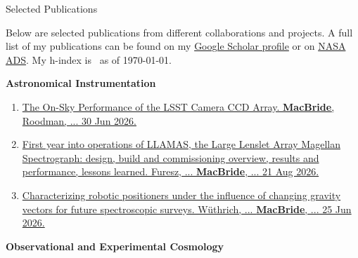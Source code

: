 \begin{rSection}{Selected Publications}

Below are selected publications from different collaborations and projects. A full list of my publications can be found on my \href{https://scholar.google.com/citations?user=XtRTswUAAAAJ&hl=en}{Google Scholar profile} or on \href{https://ui.adsabs.harvard.edu/search/fq=\%7B!type\%3Daqp\%20v\%3D\%24fq_database\%7D&fq_database=(database\%3Aastronomy\%20OR\%20database\%3Aphysics)&p_=0&q=((\%20author\%3A\%22Macbride\%2C\%20Sean\%22)\%20AND\%20year\%3A2019-2150)&sort=date\%20desc\%2C\%20bibcode\%20desc}{NASA ADS}. My h-index is \hindex\ as of \today.

\begin{rSubsection}{\textbf{Astronomical Instrumentation}}{}{}{}
\begin{enumerate}
    \item \href{https://arxiv.org/abs/2606.31806}{The On-Sky Performance of the LSST Camera CCD Array. \textbf{MacBride}, Roodman, ... 30 Jun 2026.}
    \item \href{https://www.spiedigitallibrary.org/conference-proceedings-of-spie/14149/141491L/First-year-of-LLAMAS-the-large-lenslet-array-Magellan-spectrograph/10.1117/12.3104300.short}{First year into operations of LLAMAS, the Large Lenslet Array Magellan Spectrograph: design, build and commissioning overview, results and performance, lessons learned. Furesz, ... \textbf{MacBride}, ... 21 Aug 2026.}
    \item  \href{https://arxiv.org/pdf/2606.26821}{Characterizing robotic positioners under the influence of changing gravity vectors for future spectroscopic surveys. Wüthrich, ... \textbf{MacBride}, ... 25 Jun 2026.}
\end{enumerate}
\end{rSubsection}
\begin{rSubsection}{\textbf{Observational and Experimental Cosmology}}{}{}{}
\begin{enumerate}

\end{enumerate}
\end{rSubsection}
\end{rSection}
